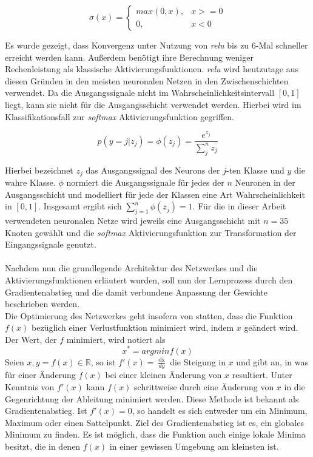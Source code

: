 \documentclass[a4paper,11pt]{article}
\begin{document}
\[\sigma(x) = 
\begin{cases}
max(0,x), & x >= 0 \\
0, & x <0
\end{cases}{}
\]

Es wurde gezeigt, dass Konvergenz unter Nutzung von \textit{relu} bis zu 6-Mal schneller erreicht werden kann. Außerdem benötigt ihre Berechnung weniger Rechenleistung als klassische Aktivierungsfunktionen. \textit{relu} wird heutzutage aus diesen Gründen in den meisten neuronalen Netzen in den Zwischenschichten verwendet. Da die Ausgangssignale nicht im Wahrscheinlichkeitsintervall $\left[0, 1\right]$ liegt, kann sie nicht für die Ausgangsschicht verwendet werden. Hierbei wird im Klassifikationsfall zur \textit{softmax} Aktivierungsfunktion gegriffen. 

\[p(y = j |z_j) = \phi(z_j) = \frac{e^{z_j}}{\sum_j^n z_j} \]

Hierbei bezeichnet $z_j$ das Ausgangssignal des Neurons der $j$-ten Klasse und $y$ die wahre Klasse. $\phi$ normiert die Ausgangssignale für jedes der $n$ Neuronen in der Ausgangsschicht und modelliert für jede der Klassen eine Art Wahrscheinlichkeit in $\left[0, 1\right]$. Insgesamt ergibt sich $\sum_{j = 1}^n \phi(z_j) = 1$. Für die in dieser Arbeit verwendeten neuronalen Netze wird jeweils eine Ausgangsschicht mit $n = 35$ Knoten gewählt und die \textit{softmax} Aktivierungsfunktion zur Transformation der Eingangssignale genutzt.\\
\\
Nachdem nun die grundlegende Architektur des Netzwerkes und die Aktivierungsfunktionen erläutert wurden, soll nun der Lernprozess durch den Gradientenabstieg und die damit verbundene Anpassung der Gewichte beschrieben werden.\\

Die Optimierung des Netzwerkes geht insofern von statten, dass die Funktion $f(x)$ bezüglich einer Verlustfunktion minimiert wird, indem $x$ geändert wird. Der Wert, der $f$ minimiert, wird notiert als 
\[x^\ast = argmin f(x)\]
Seien $x, y = f(x) \in \mathbb{R}$, so ist $f'(x) = \frac{\mathop{dx}}{dy}$ die Steigung in $x$ und gibt an, in was für einer Änderung $f(x)$ bei einer kleinen Änderung von $x$ resultiert. Unter Kenntnis von $f'(x)$ kann $f(x)$ schrittweise durch eine Änderung von $x$ in die Gegenrichtung der Ableitung minimiert werden. Diese Methode ist bekannt als Gradientenabstieg. Ist $f'(x) = 0$, so handelt es sich entweder um ein Minimum, Maximum oder einen Sattelpunkt. Ziel des Gradientenabstieg ist es, ein globales Minimum zu finden. Es ist möglich, dass die Funktion auch einige lokale Minima besitzt, die in denen $f(x)$ in einer gewissen Umgebung am kleinsten ist.
\end{document}

